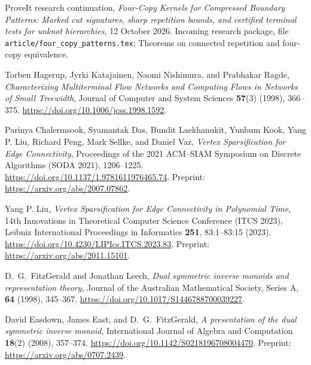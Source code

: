
ProveIt research continuation,
\emph{Four-Copy Kernels for Compressed Boundary Patterns:
Marked cut signatures, sharp repetition bounds, and certified terminal tests
for unknot hierarchies}, 12 October 2026.
Incoming research package, file
\texttt{article/four\_copy\_patterns.tex};
Theorems on connected repetition and four-copy equivalence.

Torben Hagerup, Jyrki Katajainen, Naomi Nishimura, and Prabhakar Ragde,
\emph{Characterizing Multiterminal Flow Networks and Computing Flows in
Networks of Small Treewidth},
Journal of Computer and System Sciences \textbf{57}(3) (1998), 366--375.
\url{https://doi.org/10.1006/jcss.1998.1592}.

Parinya Chalermsook, Syamantak Das, Bundit Laekhanukit, Yunbum Kook,
Yang P. Liu, Richard Peng, Mark Sellke, and Daniel Vaz,
\emph{Vertex Sparsification for Edge Connectivity},
Proceedings of the 2021 ACM--SIAM Symposium on Discrete Algorithms
(SODA 2021), 1206--1225.
\url{https://doi.org/10.1137/1.9781611976465.74}.
Preprint: \url{https://arxiv.org/abs/2007.07862}.

Yang P. Liu,
\emph{Vertex Sparsification for Edge Connectivity in Polynomial Time},
14th Innovations in Theoretical Computer Science Conference (ITCS 2023),
Leibniz International Proceedings in Informatics \textbf{251},
83:1--83:15 (2023).
\url{https://doi.org/10.4230/LIPIcs.ITCS.2023.83}.
Preprint: \url{https://arxiv.org/abs/2011.15101}.


D.~G.~FitzGerald and Jonathan Leech,
\emph{Dual symmetric inverse monoids and representation theory},
Journal of the Australian Mathematical Society, Series A,
\textbf{64} (1998), 345--367.
\url{https://doi.org/10.1017/S1446788700039227}.

David Easdown, James East, and D.~G.~FitzGerald,
\emph{A presentation of the dual symmetric inverse monoid},
International Journal of Algebra and Computation \textbf{18}(2) (2008),
357--374.
\url{https://doi.org/10.1142/S0218196708004470}.
Preprint: \url{https://arxiv.org/abs/0707.2439}.

